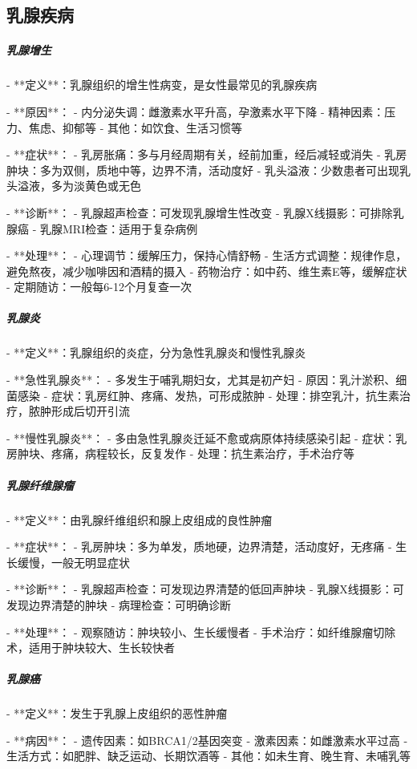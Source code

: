 \begin{enumerate}
\subsection{乳腺疾病}

\subparagraph{乳腺增生}

- **定义**：乳腺组织的增生性病变，是女性最常见的乳腺疾病

- **原因**：
  - 内分泌失调：雌激素水平升高，孕激素水平下降
  - 精神因素：压力、焦虑、抑郁等
  - 其他：如饮食、生活习惯等

- **症状**：
  - 乳房胀痛：多与月经周期有关，经前加重，经后减轻或消失
  - 乳房肿块：多为双侧，质地中等，边界不清，活动度好
  - 乳头溢液：少数患者可出现乳头溢液，多为淡黄色或无色

- **诊断**：
  - 乳腺超声检查：可发现乳腺增生性改变
  - 乳腺X线摄影：可排除乳腺癌
  - 乳腺MRI检查：适用于复杂病例

- **处理**：
  - 心理调节：缓解压力，保持心情舒畅
  - 生活方式调整：规律作息，避免熬夜，减少咖啡因和酒精的摄入
  - 药物治疗：如中药、维生素E等，缓解症状
  - 定期随访：一般每6-12个月复查一次

\subparagraph{乳腺炎}

- **定义**：乳腺组织的炎症，分为急性乳腺炎和慢性乳腺炎

- **急性乳腺炎**：
  - 多发生于哺乳期妇女，尤其是初产妇
  - 原因：乳汁淤积、细菌感染
  - 症状：乳房红肿、疼痛、发热，可形成脓肿
  - 处理：排空乳汁，抗生素治疗，脓肿形成后切开引流

- **慢性乳腺炎**：
  - 多由急性乳腺炎迁延不愈或病原体持续感染引起
  - 症状：乳房肿块、疼痛，病程较长，反复发作
  - 处理：抗生素治疗，手术治疗等

\subparagraph{乳腺纤维腺瘤}

- **定义**：由乳腺纤维组织和腺上皮组成的良性肿瘤

- **症状**：
  - 乳房肿块：多为单发，质地硬，边界清楚，活动度好，无疼痛
  - 生长缓慢，一般无明显症状

- **诊断**：
  - 乳腺超声检查：可发现边界清楚的低回声肿块
  - 乳腺X线摄影：可发现边界清楚的肿块
  - 病理检查：可明确诊断

- **处理**：
  - 观察随访：肿块较小、生长缓慢者
  - 手术治疗：如纤维腺瘤切除术，适用于肿块较大、生长较快者

\subparagraph{乳腺癌}

- **定义**：发生于乳腺上皮组织的恶性肿瘤

- **病因**：
  - 遗传因素：如BRCA1/2基因突变
  - 激素因素：如雌激素水平过高
  - 生活方式：如肥胖、缺乏运动、长期饮酒等
  - 其他：如未生育、晚生育、未哺乳等


\end{enumerate}
